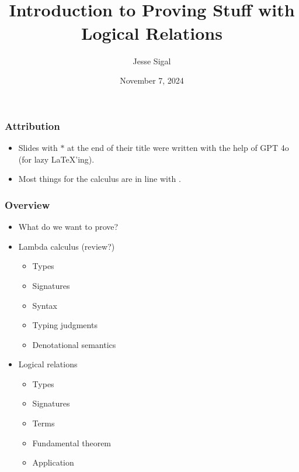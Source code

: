 \documentclass[aspectratio=169]{beamer}
\title{Introduction to Proving Stuff\textsuperscript{\texttrademark} with Logical Relations}
\author{Jesse Sigal}
\date{November 7, 2024}
\begin{document}
\begin{frame}
\titlepage
\end{frame}

\begin{frame}
\frametitle{Attribution}
\begin{itemize}
\item Slides with $*$ at the end of their title were written with the help of GPT 4o (for lazy \LaTeX'ing).
\item Most things for the calculus are in line with \cite{Crole_1994}.
\end{itemize}
\end{frame}

\begin{frame}
\frametitle{Overview}
\begin{itemize}
    \item What do we want to prove?
    \item Lambda calculus (review?)
    \begin{itemize}
        \item Types
        \item Signatures
        \item Syntax
        \item Typing judgments
        \item Denotational semantics
    \end{itemize}
    \item Logical relations
    \begin{itemize}
        \item Types
        \item Signatures
        \item Terms
        \item Fundamental theorem
        \item Application
    \end{itemize}
\end{itemize}
\end{frame}
\end{document}
